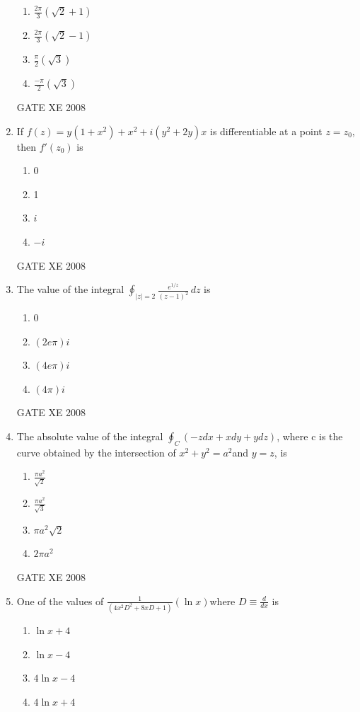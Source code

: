 \documentclass[12pt]{article}
\begin{document}
\begin{enumerate}
\begin{enumerate}
\item $\frac{2\pi}{3} (\sqrt{2} +1)$
\item $\frac{2\pi}{3} (\sqrt{2} -1)$
\item $\frac{\pi}{2} (\sqrt{3})$
\item $\frac{-\pi}{2} (\sqrt{3})$
\end{enumerate}

GATE XE 2008
\item If $f(z)=y(1+x^2) +x^2 +i(y^2+2y)x$ is differentiable at a point $z=z_0$, then $f'(z_0)$ is

\begin{enumerate}
\item 0
\item 1
\item $i$
\item $-i$
\end{enumerate}

GATE XE 2008

\item  The value of the integral $\oint_{|z|=2} \frac{e^{1/z}}{(z-1)^2} \,dz$ is

\begin{enumerate}
\item 0
\item $(2e\pi)i$
 \item $(4e\pi)i$
\item $(4\pi)i$
\end{enumerate}

GATE XE 2008
\item  The absolute value of the integral $\oint_C(-zdx+xdy+ydz)$, where c is the curve obtained by the intersection of $x^2 + y^2 = a^2$and $y=z$, is

\begin{enumerate}
\item  $\frac{\pi a^2}{\sqrt{2}}$
\item $\frac{\pi a^2}{\sqrt{3}}$
\item $\pi a^2 \sqrt{2}$
\item $2\pi a^2$
\end{enumerate}

GATE XE 2008
\item  One of the values of  $\frac{1}{(4x^2D^2 + 8xD+1)}(\ln{x})$where $D\equiv \frac{d}{dx}$ is

\begin{enumerate}
\item  $\ln{x} +4$
\item $\ln{x} -4$
\item $4\ln{x} -4$
\item $4\ln{x} +4$
\end{enumerate}


\end{enumerate}
\end{document}

